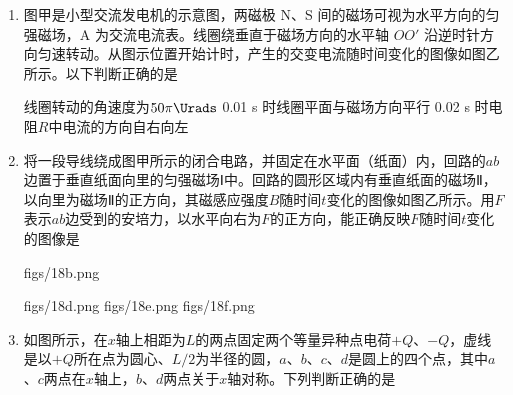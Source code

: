 \documentclass[\gkver]{gaokaozhenti}
\begin{document}
\begin{enumerate}

\item
图甲是小型交流发电机的示意图，两磁极 N、S 间的磁场可视为水平方向的匀强磁场，A 为交流电流表。线圈绕垂直于磁场方向的水平轴 $OO'$ 沿逆时针方向匀速转动。从图示位置开始计时，产生的交变电流随时间变化的图像如图乙所示。以下判断正确的是


{线圈转动的角速度为$50\pi\Urads$}
{0.01 s 时线圈平面与磁场方向平行}
{0.02 s 时电阻$R$中电流的方向自右向左}


\item
将一段导线绕成图甲所示的闭合电路，并固定在水平面（纸面）内，回路的$ab$边置于垂直纸面向里的匀强磁场Ⅰ中。回路的圆形区域内有垂直纸面的磁场Ⅱ，以向里为磁场Ⅱ的正方向，其磁感应强度$B$随时间$t$变化的图像如图乙所示。用$F$表示$ab$边受到的安培力，以水平向右为$F$的正方向，能正确反映$F$随时间$t$变化的图像是

{figs/18b.png}

{figs/18d.png}
{figs/18e.png}
{figs/18f.png}


\item
如图所示，在$x$轴上相距为$L$的两点固定两个等量异种点电荷$+Q$、$-Q$，虚线是以$+Q$所在点为圆心、$L/2$为半径的圆，$a$、$b$、$c$、$d$是圆上的四个点，其中$a$、$c$两点在$x$轴上，$b$、$d$两点关于$x$轴对称。下列判断正确的是



\end{enumerate}
\end{document}
